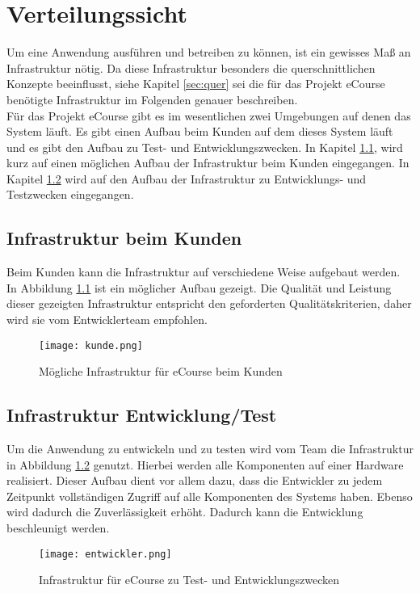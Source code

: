 \chapter{Verteilungssicht}
Um eine Anwendung ausführen und betreiben zu können, ist ein gewisses Maß an Infrastruktur nötig. Da diese Infrastruktur besonders die querschnittlichen Konzepte beeinflusst, siehe Kapitel \ref{sec:quer} sei die für das Projekt eCourse benötigte Infrastruktur im Folgenden genauer beschreiben. \\

Für das Projekt eCourse gibt es im wesentlichen zwei Umgebungen auf denen das System läuft. Es gibt einen Aufbau beim Kunden auf dem dieses System läuft und es gibt den Aufbau zu Test- und Entwicklungszwecken. In Kapitel \ref{sec:Kunde}, wird kurz auf einen möglichen Aufbau der Infrastruktur beim Kunden eingegangen. In Kapitel \ref{sec:Entwicklung} wird auf den Aufbau der Infrastruktur zu Entwicklungs- und Testzwecken eingegangen.
\section{Infrastruktur beim Kunden}
\label{sec:Kunde}
Beim Kunden kann die Infrastruktur auf verschiedene Weise aufgebaut werden. In Abbildung \ref{fib:Kunde} ist ein möglicher Aufbau gezeigt. Die Qualität und Leistung dieser gezeigten Infrastruktur entspricht den geforderten Qualitätskriterien, daher wird sie vom Entwicklerteam empfohlen.

\begin{figure}[H]
\centering
\texttt{[image: kunde.png]}
\caption{Mögliche Infrastruktur für eCourse beim Kunden}
\label{fib:Kunde}
\end{figure}


\section{Infrastruktur Entwicklung/Test}
\label{sec:Entwicklung}
Um die Anwendung zu entwickeln und zu testen wird vom Team die Infrastruktur in Abbildung \ref{fib:Entwickler} genutzt. Hierbei werden alle Komponenten auf einer Hardware realisiert. Dieser Aufbau dient vor allem dazu, dass die Entwickler zu jedem Zeitpunkt vollständigen Zugriff auf alle Komponenten des Systems haben. Ebenso wird dadurch die Zuverlässigkeit erhöht. Dadurch kann die Entwicklung beschleunigt werden.

\begin{figure}[H]
\centering
\texttt{[image: entwickler.png]}
\caption{Infrastruktur für eCourse zu Test- und Entwicklungszwecken}
\label{fib:Entwickler}
\end{figure}